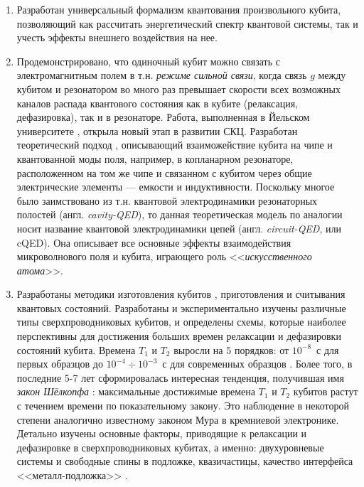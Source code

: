 \begin{enumerate}
	\item Разработан универсальный формализм \cite{devoret1995quantum} квантования произвольного кубита, позволяющий как рассчитать энергетический спектр квантовой системы, так и учесть эффекты внешнего воздействия на нее.
	\item Продемонстрировано, что одиночный кубит можно связать с электромагнитным полем в т.н. \textit{режиме сильной связи}, когда связь $g$ между кубитом и резонатором во много раз превышает скорости всех возможных каналов распада квантового состояния как в кубите (релаксация, дефазировка), так и в резонаторе. Работа, выполненная в Йельском университете \cite{wallraff2004strong}, открыла новый этап в развитии СКЦ. Разработан теоретический подход \cite{blais2004cavity}, описывающий взаиможействие кубита на чипе и квантованной моды поля, например, в копланарном резонаторе, расположенном на том же чипе и связанном с кубитом через общие электрические элементы --- емкости и индуктивности. Поскольку многое было заимствовано из т.н. квантовой электродинамики резонаторных полостей (англ. \textit{cavity-QED}), то данная теоретическая модель по аналогии носит название квантовой электродинамики цепей (англ. \textit{circuit-QED}, или cQED). Она описывает все основные эффекты взаимодействия микроволнового поля и кубита, играющего роль <<\textit{искусственного атома}>>.
	\item Разработаны методики изготовления кубитов \cite{vieu2000electron,devoret2005implementing}, приготовления и считывания квантовых состояний. Разработаны и экспериментально изучены различные типы сверхпроводниковых кубитов, и определены схемы, которые наиболее перспективны для достижения больших времен релаксации и дефазировки состояний кубита. Времена $T_1$ и $T_2$ выросли на 5 порядков: от $10^{-8}$~с для первых образцов \cite{chiorescu2004coherent} до $10^{-4}\div10^{-3}$~с для современных образцов \cite{barends2014superconducting,takita2017experimental}. Более того, в последние 5-7 лет сформировалась интересная тенденция, получившая имя \textit{закон Шёлкопфа} \cite{schoelkopf2008wiring,devoret2013superconducting}: максимальные достижимые времена $T_1$ и $T_2$ кубитов растут с течением времени по показательному закону. Это наблюдение в некоторой степени аналогично известному законом Мура в кремниевой электронике. Детально изучены основные факторы, приводящие к релаксации и дефазировке в сверхпроводниковых кубитах, а именно: двухуровневые системы и свободные спины в подложке, квазичастицы, качество интерфейса <<металл-подложка>> \cite{Wenner2011surface,dunsworth2017characterization}.

\end{enumerate}
